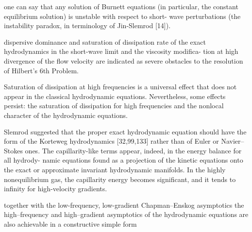 
one can say that any solution of Burnett equations (in particular, the constant equilibrium solution) is unstable with respect to short- wave perturbations (the instability paradox, in terminology of Jin-Slemrod [14]).

dispersive dominance and saturation of dissipation rate of the exact hydrodynamics in the short-wave limit and the viscosity modifica- tion at high divergence of the flow velocity are indicated as severe obstacles to the resolution of Hilbert’s 6th Problem.

Saturation of dissipation at high frequencies is a universal effect that does not appear in the classical hydrodynamic equations.
Nevertheless, some effects persist: the saturation of dissipation for high frequencies and the nonlocal character of the hydrodynamic equations.

Slemrod suggested that the proper exact hydrodynamic equation should have the form of the Korteweg hydrodynamics [32,99,133] rather than of Euler or Navier–Stokes ones.
The capillarity-like terms appear, indeed, in the energy balance for all hydrody- namic equations found as a projection of the kinetic equations onto the exact or approximate invariant hydrodynamic manifolds.
In the highly nonequilibrium gas, the capillarity energy becomes significant, and it tends to infinity for high-velocity gradients.

together with the low-frequency, low-gradient Chapman–Enskog asymptotics the high–frequency and high–gradient asymptotics of the hydrodynamic equations are also achievable in a constructive simple form


